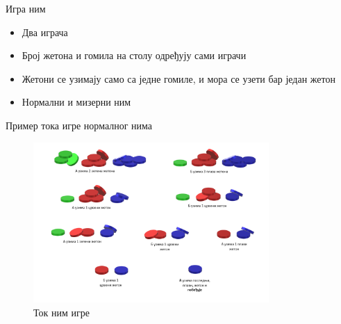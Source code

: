 \documentclass[10pt]{beamer}
\theoremstyle{remark}
\theoremstyle{definition}
\begin{document}
	\begin{frame}{Игра ним}
		\begin{itemize}
			\item Два играча
			\item Број жетона и гомила на столу одређују сами играчи
			\item Жетони се узимају само са једне гомиле, и мора се узети бар један жетон
			\item Нормални и мизерни ним
		\end{itemize}
	\end{frame}		
%
		
	\begin{frame}{Пример тока игре нормалног нима}
		\begin{figure}
	        \centering
	        \includegraphics[width=0.8\textwidth]{../src/statistics/picture/NimPrimer.png}
	        \caption{Ток ним игре}
	        \label{fig:nimprimer}
	    \end{figure}
	\end{frame}
\end{document}
